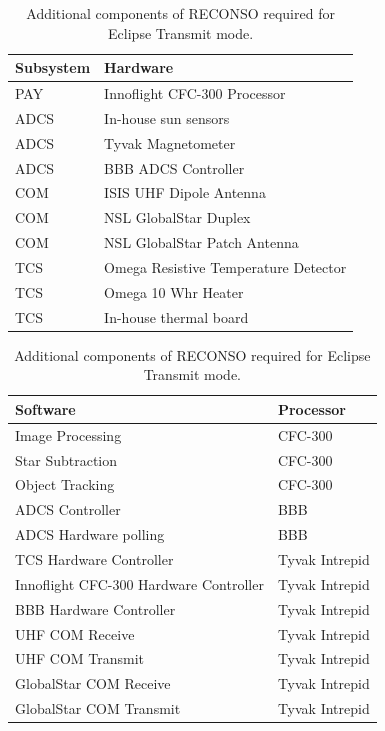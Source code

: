 \documentclass{article}
\begin{document}
\begin{table}[h!]
\caption{Additional components of RECONSO required for Eclipse Transmit mode.}
\begin{adjustbox}{center}
\begin{tabular}{|l|l|}
\hline
Subsystem & Hardware \\ \hline \hline
PAY & Innoflight CFC-300 Processor  \\ \hline \hline
ADCS & In-house sun sensors  \\ \hline
ADCS & Tyvak Magnetometer \\ \hline
ADCS & BBB ADCS Controller \\ \hline \hline
COM & ISIS UHF Dipole Antenna  \\ \hline
COM & NSL GlobalStar Duplex  \\ \hline
COM & NSL GlobalStar Patch Antenna \\ \hline \hline
TCS & Omega Resistive Temperature Detector \\ \hline
TCS & Omega 10 Whr Heater  \\ \hline
TCS & In-house thermal board \\ \hline
\end{tabular}

\quad

\begin{tabular}{|l|l|}
\hline
Software & Processor \\ \hline \hline
Image Processing & CFC-300 \\ \hline
Star Subtraction & CFC-300 \\ \hline
Object Tracking & CFC-300 \\ \hline \hline
ADCS Controller & BBB \\ \hline
ADCS Hardware polling & BBB \\ \hline \hline
TCS Hardware Controller & Tyvak Intrepid \\ \hline
Innoflight CFC-300 Hardware Controller & Tyvak Intrepid \\ \hline
BBB Hardware Controller & Tyvak Intrepid \\ \hline
UHF COM Receive & Tyvak Intrepid \\ \hline
UHF COM Transmit & Tyvak Intrepid \\ \hline
GlobalStar COM Receive & Tyvak Intrepid \\ \hline
GlobalStar COM Transmit & Tyvak Intrepid \\ \hline
\end{tabular}
\end{adjustbox}
\end{table}
\end{document}
